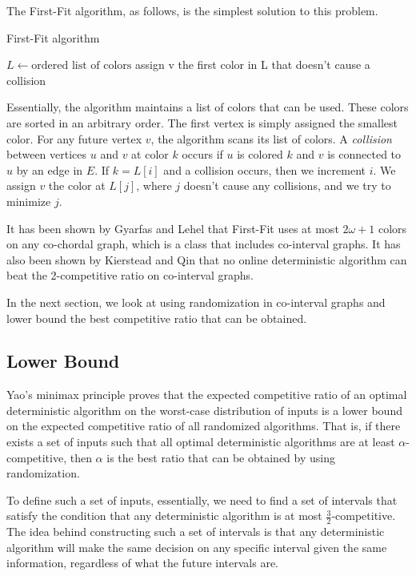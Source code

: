 The First-Fit algorithm, as follows, is the simplest solution to this problem.

\begin{algorithm}
\caption{First-Fit algorithm}
$L \leftarrow \text{ordered list of colors}$
 {
  assign v the first color in L that doesn't cause a collision
}
\end{algorithm}

Essentially, the algorithm maintains a list of colors that can be used. These colors are sorted in an arbitrary order. The first vertex is simply assigned the smallest color. For any future vertex $v$, the algorithm scans its list of colors. A \emph{collision} between vertices $u$ and $v$ at color $k$ occurs if $u$ is colored $k$ and $v$ is connected to $u$ by an edge in $E$. If $k = L[i]$ and a collision occurs, then we increment $i$. We assign $v$ the color at $L[j]$, where $j$ doesn't cause any collisions, and we try to minimize $j$.

It has been shown by Gyarfas and Lehel \cite{gyarfas} that First-Fit uses at most $2\omega+1$ colors on any co-chordal graph, which is a class that includes co-interval graphs. It has also been shown by Kierstead and Qin \cite{kierstead} that no online deterministic algorithm can beat the 2-competitive ratio on co-interval graphs.

In the next section, we look at using randomization in co-interval graphs and lower bound the best competitive ratio that can be obtained.
\subsection{Lower Bound}
Yao's minimax principle proves that the expected competitive ratio of an optimal deterministic algorithm on the worst-case distribution of inputs is a lower bound on the expected competitive ratio of all randomized algorithms. That is, if there exists a set of inputs such that all optimal deterministic algorithms are at least $\alpha$-competitive, then $\alpha$ is the best ratio that can be obtained by using randomization.

To define such a set of inputs, essentially, we need to find a set of intervals that satisfy the condition that any deterministic algorithm is at most $\frac{3}{2}$-competitive. The idea behind constructing such a set of intervals is that any deterministic algorithm will make the same decision on any specific interval given the same information, regardless of what the future intervals are.

